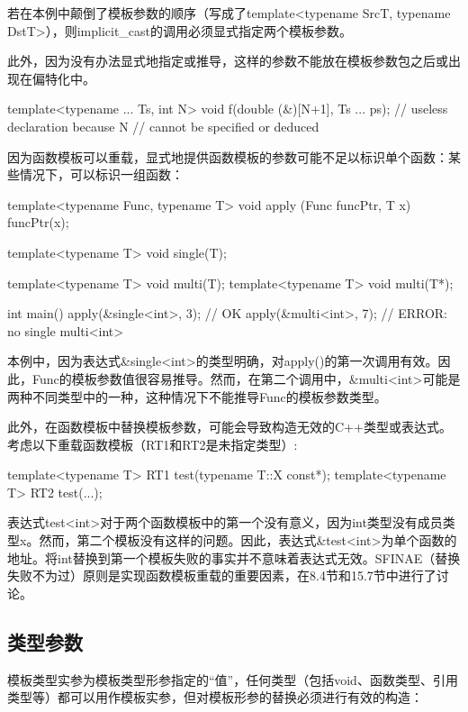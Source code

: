 若在本例中颠倒了模板参数的顺序（写成了template<typename SrcT, typename DstT>），则implicit\_cast的调用必须显式指定两个模板参数。

此外，因为没有办法显式地指定或推导，这样的参数不能放在模板参数包之后或出现在偏特化中。

\begin{cpp}
template<typename ... Ts, int N>
void f(double (&)[N+1], Ts ... ps); // useless declaration because N
// cannot be specified or deduced
\end{cpp}

因为函数模板可以重载，显式地提供函数模板的参数可能不足以标识单个函数：某些情况下，可以标识一组函数：

\begin{cpp}
template<typename Func, typename T>
void apply (Func funcPtr, T x) {
	funcPtr(x);
}

template<typename T> void single(T);

template<typename T> void multi(T);
template<typename T> void multi(T*);

int main() {
	apply(&single<int>, 3); // OK
	apply(&multi<int>, 7); // ERROR: no single multi<int>
}
\end{cpp}

本例中，因为表达式\&single<int>的类型明确，对apply()的第一次调用有效。因此，Func的模板参数值很容易推导。然而，在第二个调用中，\&multi<int>可能是两种不同类型中的一种，这种情况下不能推导Func的模板参数类型。

此外，在函数模板中替换模板参数，可能会导致构造无效的C++类型或表达式。考虑以下重载函数模板（RT1和RT2是未指定类型）:

\begin{cpp}
template<typename T> RT1 test(typename T::X const*);
template<typename T> RT2 test(...);
\end{cpp}

表达式test<int>对于两个函数模板中的第一个没有意义，因为int类型没有成员类型x。然而，第二个模板没有这样的问题。因此，表达式\&test<int>为单个函数的地址。将int替换到第一个模板失败的事实并不意味着表达式无效。SFINAE（替换失败不为过）原则是实现函数模板重载的重要因素，在8.4节和15.7节中进行了讨论。

\subsection{类型参数}

模板类型实参为模板类型形参指定的“值”，任何类型（包括void、函数类型、引用类型等）都可以用作模板实参，但对模板形参的替换必须进行有效的构造：

